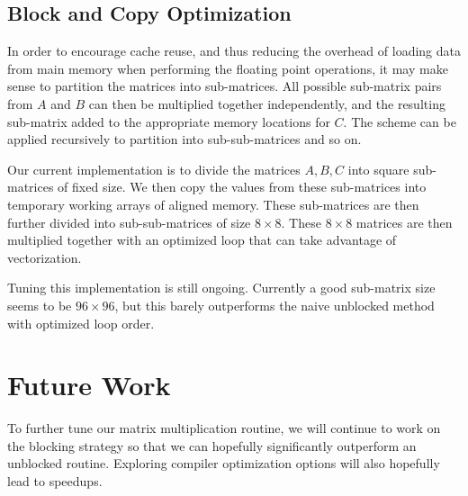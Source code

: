 \documentclass[fontsize=11pt]{scrartcl}
\numberwithin{equation}{section}        %
\numberwithin{figure}{section}          %
\numberwithin{table}{section}               %
\begin{document}
\subsection{Block and Copy Optimization}
In order to encourage cache reuse, and thus reducing the overhead of loading 
data from main memory when performing the floating point operations, it may make
sense to partition the matrices into sub-matrices.  All possible sub-matrix pairs
from $A$ and $B$ can then be multiplied together independently, and the resulting
sub-matrix added to the appropriate memory locations for $C$.  The scheme can be 
applied recursively to partition into sub-sub-matrices and so on.

Our current implementation is to divide the matrices $A, B, C$ into square sub-matrices
of fixed size.  We then copy the values from these sub-matrices into temporary working
arrays of aligned memory.  These sub-matrices are then further divided into sub-sub-matrices
of size $8 \times 8$.  These $8 \times 8$ matrices are then multiplied together with an 
optimized loop that can take advantage of vectorization.

Tuning this implementation is still ongoing.  Currently a good sub-matrix size seems
to be $96 \times 96$, but this barely outperforms the naive unblocked method with 
optimized loop order.  

\section{Future Work}

To further tune our matrix multiplication routine, we will continue to work on the 
blocking strategy so that we can hopefully significantly outperform an unblocked routine.
Exploring compiler optimization options will also hopefully lead to speedups.

\end{document}
